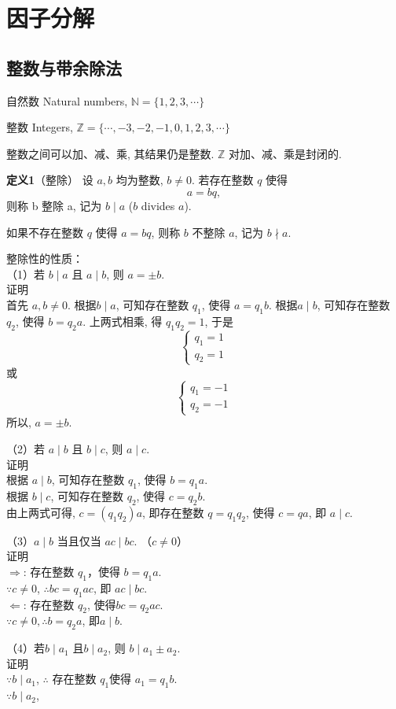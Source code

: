 \section{因子分解}
\subsection{整数与带余除法}

自然数 Natural numbers, 
$ \mathbb{N} = \{ 1, 2, 3, \cdots \} $

整数 Integers, 
$ \mathbb{Z} = \{ \cdots, -3, -2, -1, 0, 1, 2, 3, \cdots \} $

整数之间可以加、减、乘, 其结果仍是整数. $ \mathbb{Z} $ 对加、减、乘是封闭的. 

\textbf{定义1}（整除） 设 $a, b$ 均为整数, $ b \neq 0 $. 若存在整数 $ q $ 使得
\[ 
    a = bq,
\]
则称 b 整除 a, 记为 $ b \mid a $ ($b$ divides $a$). 

如果不存在整数 $q$ 使得 $a=bq$, 则称 $b$ 不整除 $a$, 记为 $b \nmid a$. 

整除性的性质：\\
（1）若 $ b \mid a $ 且 $ a \mid b$, 则 $a = \pm b$.\\
证明\\
首先 $a,b\neq 0$.
根据$ b \mid a $, 可知存在整数 $q_1$, 使得 $a=q_1 b$. 
根据$ a \mid b$, 可知存在整数 $q_2$, 使得 $b=q_2 a$. 
上两式相乘, 得 $q_1 q_2 = 1$, 于是\\
\[
    \left\{ 
        \begin{array}{lc}
            q_1 = 1\\
            q_2 = 1
        \end{array}
    \right.
\]
或
\[
    \left\{ 
        \begin{array}{lc}
            q_1 = -1\\
            q_2 = -1
        \end{array}
    \right.
\]
所以, $a = \pm b$.

（2）若 $ a \mid b $ 且 $ b \mid c $, 则 $a \mid c$.\\
证明\\
根据 $a\mid b$, 可知存在整数 $q_1$, 使得 $b=q_1 a$.\\
根据 $b\mid c$, 可知存在整数 $q_2$, 使得 $c=q_2 b$.\\
由上两式可得, $c=(q_1q_2)a$, 即存在整数 $q=q_1q_2$, 使得 $c=qa$, 即 $a \mid c$.

（3）$a\mid b$ 当且仅当 $ac\mid bc$. （$c\neq 0$）\\
证明\\
$\Rightarrow$: 存在整数 $q_1$，使得 $b=q_1a$.\\
$\because c\neq 0$, $\therefore bc=q_1ac$, 即 $ac\mid bc$.\\
$\Leftarrow$: 存在整数  $q_2$, 使得$bc=q_2ac$.\\
$\because c\neq 0, \therefore b=q_2a$, 即$a\mid b$.

（4）若$b\mid a_1$ 且$b\mid a_2$, 则 $b\mid a_1\pm a_2$.\\
证明\\
$\because b\mid a_1$, $\therefore$ 存在整数 $q_1$使得 $a_1 = q_1b$.\\
$\because b\mid a_2$,  
